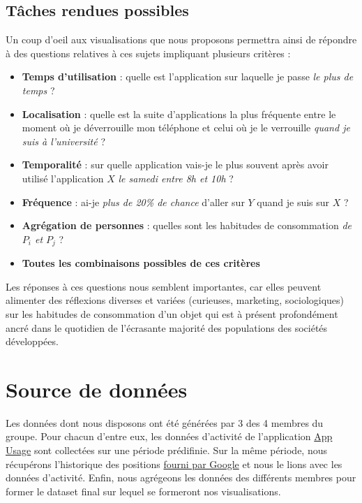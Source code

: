 \documentclass[a4paper, 11pt]{article}
\begin{document}
        \subsection{Tâches rendues possibles}
        Un coup d'oeil aux visualisations que nous proposons permettra ainsi de répondre à des questions relatives à ces sujets impliquant plusieurs critères :

        \begin{itemize}
            \item \textbf{Temps d'utilisation} : quelle est l'application sur laquelle je passe \textit{le plus de temps} ?
            \item \textbf{Localisation} : quelle est la suite d'applications la plus fréquente entre le moment où je déverrouille mon téléphone et celui où je le verrouille \textit{quand je suis à l'université} ?
            \item \textbf{Temporalité} : sur quelle application vais-je le plus souvent après avoir utilisé l'application $X$ \textit{le samedi entre 8h et 10h} ?
            \item \textbf{Fréquence} : ai-je \textit{plus de 20\% de chance} d'aller sur $Y$ quand je suis sur $X$ ?
            \item \textbf{Agrégation de personnes} : quelles sont les habitudes de consommation \textit{de $P_i$ et $P_j$} ?
            \item \textbf{Toutes les combinaisons possibles de ces critères}
        \end{itemize}

        Les réponses à ces questions nous semblent importantes, car elles peuvent alimenter des réflexions diverses et variées (curieuses, marketing, sociologiques) sur les habitudes de consommation d'un objet qui est à présent profondément ancré dans le quotidien de l'écrasante majorité des populations des sociétés développées.

    \section{Source de données}
        Les données dont nous disposons ont été générées par 3 des 4 membres du groupe. Pour chacun d'entre eux, les données d'activité de l'application \href{https://play.google.com/store/apps/details?id=com.a0soft.gphone.uninstaller&hl=fr}{App Usage} sont collectées sur une période prédifinie. Sur la même période, nous récupérons l'historique des positions \href{https://takeout.google.com/settings/takeout}{fourni par Google} et nous le lions avec les données d'activité. Enfin, nous agrégeons les données des différents membres pour former le dataset final sur lequel se formeront nos visualisations.
\end{document}
